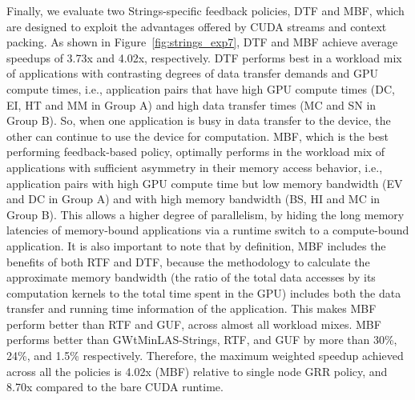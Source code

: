 Finally, we evaluate two Strings-specific feedback policies, DTF and MBF, which are designed to exploit the advantages offered by CUDA streams and context packing. As shown in Figure~\ref{fig:strings_exp7}, DTF and MBF achieve average speedups of 3.73x and 4.02x, respectively.  DTF performs best in a workload mix of applications with contrasting degrees of data transfer demands and GPU compute times, i.e., application pairs that have high GPU compute times (DC, EI, HT and MM in Group A) and high data transfer times (MC and SN in Group B). So, when one application is busy in data transfer to the device, the other can continue to use the device for computation. MBF, which is the best performing feedback-based policy, optimally performs in the workload mix of applications with sufficient asymmetry in their memory access behavior, i.e., application pairs with high GPU compute time but low memory bandwidth (EV and DC in Group A) and with high memory bandwidth (BS, HI and MC in Group B). This allows a higher degree of parallelism, by hiding the long memory latencies of memory-bound applications via a runtime switch to a compute-bound application. It is also important to note that by definition, MBF includes the benefits of both RTF and DTF, because the methodology to calculate the approximate memory bandwidth (the ratio of the total data accesses by its computation kernels to the total time spent in the GPU) includes both the data transfer and running time information of the application. This makes MBF perform better than RTF and GUF, across almost all workload mixes. MBF performs better than GWtMinLAS-Strings, RTF, and GUF by more than 30\%, 24\%, and 1.5\% respectively. Therefore, the maximum weighted speedup achieved across all the policies is 4.02x (MBF) relative to single node GRR policy, and 8.70x compared to the bare CUDA runtime.       

